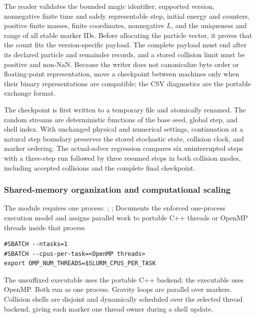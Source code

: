 The reader validates the bounded magic identifier, supported version,
nonnegative finite time and safely representable step, initial energy and
counters, positive finite masses, finite coordinates, nonnegative \(L\), and
the uniqueness and range of all stable marker IDs.  Before allocating the
particle vector, it proves that the count fits the version-specific payload.
The complete payload must end after its declared particle and remainder
records, and a stored collision limit must be positive and non-NaN.
Because the writer does not canonicalize byte order or floating-point
representation, move a checkpoint between machines only when their binary
representations are compatible; the CSV diagnostics are the portable
exchange format.

The checkpoint is first written to a temporary file and atomically renamed.
The random streams are deterministic functions of the base seed, global step,
and shell index.  With unchanged physical and numerical settings,
continuation at a natural step boundary preserves the stored stochastic
state, collision clock, and marker ordering.  The actual-solver regression
compares six uninterrupted steps with a three-step run followed by three
resumed steps in both collision modes, including accepted collisions and the
complete final checkpoint.

\subsubsection{Shared-memory organization and computational scaling}

The module requires one process:
{; ;
 }
{Documents the enforced one-process execution model and assigns parallel work
 to portable C++ threads or OpenMP threads inside that process}
\begin{lstlisting}
#SBATCH --ntasks=1
#SBATCH --cpus-per-task=<OpenMP threads>
export OMP_NUM_THREADS=$SLURM_CPUS_PER_TASK
\end{lstlisting}
The unsuffixed executable uses the portable C++  backend;
the  executable uses OpenMP.  Both run as one process.  Gravity
loops are parallel over markers.  Collision shells are disjoint and
dynamically scheduled over the selected thread backend, giving each marker
one thread owner during a shell update.

